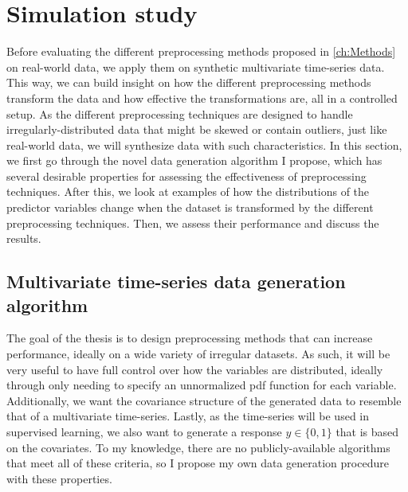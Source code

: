 \documentclass{statsmsc}
\begin{document}
{%

\section{Simulation study}%
\label{sec:Simulation study}%

Before evaluating the different preprocessing methods proposed in \cref{ch:Methods} on real-world
data, we apply them on synthetic multivariate time-series data. This way, we can build
insight on how the different preprocessing methods transform the data and how effective the
transformations are, all in a controlled setup. As the different preprocessing techniques are
designed to handle irregularly-distributed data that might be skewed or contain outliers, just like
real-world data, we will synthesize data with such characteristics.
In this section, we first go through the novel data generation algorithm I propose, which
has several desirable properties for assessing the effectiveness of preprocessing
techniques. After this, we look at examples of how the distributions of the predictor variables
change when the dataset is transformed by the different preprocessing techniques. Then, we assess
their performance and discuss the results.



\subsection{Multivariate time-series data generation algorithm}%
\label{sub:data_gen}

The goal of the thesis is to design preprocessing methods that can increase performance,
ideally on a wide variety of irregular datasets.
As such, it will be very useful to have full control over how
the variables are distributed, ideally through only needing to specify an
unnormalized \ac{pdf} function for each variable.  Additionally, we
want the covariance structure of the generated data to resemble that of a
multivariate time-series. Lastly, as the time-series will be used in supervised
learning, we also want to generate a response $y \in \{0,1\}$ that is based on the
covariates. To my knowledge, there are no publicly-available
algorithms that meet all of these criteria, so I propose my own
data generation procedure with these properties.

}
\end{document}
